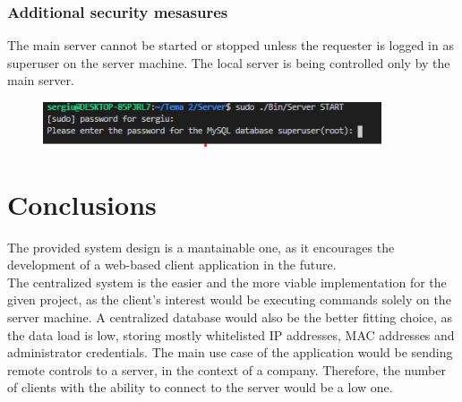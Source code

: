 \documentclass[runningheads]{llncs}
\begin{document}
\subsubsection{Additional security mesasures}
The main server cannot be started or stopped unless the requester is logged in as superuser on the server machine. The local server is being controlled only by the main server.\\
\begin{figure}[H]
\centering
\includegraphics[width=100mm]{Superuser.png}
\end{figure}

\section{Conclusions}
The provided system design is a mantainable one, as it encourages the development of a web-based client application in the future.\\
The centralized system is the easier and the more viable implementation for the given project, as the client's interest would be executing commands solely on the server machine. A centralized database would also be the better fitting choice, as the data load is low, storing mostly whitelisted IP addresses, MAC addresses and administrator credentials. The main use case of the application would be sending remote controls to a server, in the context of a company. Therefore, the number of clients with the ability to connect to the server would be a low one.
\end{document}
